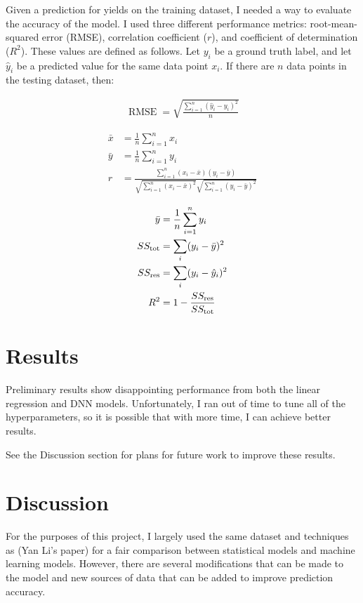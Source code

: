 \documentclass[letterpaper]{article}
\begin{document}
Given a prediction for yields on the training dataset, I needed a way to evaluate the accuracy of the model. I used three different performance metrics: root-mean-squared error (RMSE), correlation coefficient ($r$), and coefficient of determination ($R^2$). These values are defined as follows. Let $y_i$ be a ground truth label, and let $\hat{y}_i$ be a predicted value for the same data point $x_i$. If there are $n$ data points in the testing dataset, then:

\begin{align*}
\operatorname{RMSE} = \sqrt{\frac{\sum_{i=1}^n (\hat y_i - y_i)^2}{n}}
\end{align*}

\begin{align*}
\bar{x} &= \frac{1}{n}\sum_{i=1}^n x_i \\
\bar{y} &= \frac{1}{n}\sum_{i=1}^n y_i \\
r &= \frac{\sum ^n _{i=1}(x_i - \bar{x})(y_i - \bar{y})}{\sqrt{\sum ^n _{i=1}(x_i - \bar{x})^2} \sqrt{\sum ^n _{i=1}(y_i - \bar{y})^2}}
\end{align*}

\begin{align*}
\bar{y} &= \frac{1}{n}\sum_{i=1}^n y_i \\
SS_\text{tot} &= \sum_i (y_i-\bar{y})^2 \\
SS_\text{res} &= \sum_i (y_i - \hat y_i)^2 \\
R^2 &= 1 - \frac{SS_{\rm res}}{SS_{\rm tot}}
\end{align*}

\section{Results}

Preliminary results show disappointing performance from both the linear regression and DNN models. Unfortunately, I ran out of time to tune all of the hyperparameters, so it is possible that with more time, I can achieve better results.

See the Discussion section for plans for future work to improve these results.

\section{Discussion}

For the purposes of this project, I largely used the same dataset and techniques as (Yan Li's paper) for a fair comparison between statistical models and machine learning models. However, there are several modifications that can be made to the model and new sources of data that can be added to improve prediction accuracy.
\end{document}
